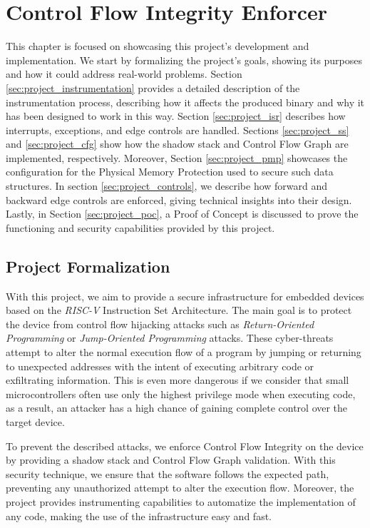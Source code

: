 \chapter{Control Flow Integrity Enforcer}
\label{cha:project}

This chapter is focused on showcasing this project's development and
implementation. We start by formalizing the project's goals, showing its
purposes and how it could address real-world problems. Section \ref{sec:project_instrumentation}
provides a detailed description of the instrumentation process, describing how
it affects the produced binary and why it has been designed to work in this way.
Section \ref{sec:project_isr} describes how interrupts, exceptions, and edge controls
are handled. Sections \ref{sec:project_ss} and \ref{sec:project_cfg} show how
the shadow stack and Control Flow Graph are implemented, respectively. Moreover,
Section \ref{sec:project_pmp} showcases the configuration for the Physical Memory
Protection used to secure such data structures. In section
\ref{sec:project_controls}, we describe how forward and backward edge controls are
enforced, giving technical insights into their design. Lastly, in Section
\ref{sec:project_poc}, a Proof of Concept is discussed to prove the functioning and
security capabilities provided by this project.

\section{Project Formalization}
\label{sec:project_formalization}

With this project, we aim to provide a secure infrastructure for embedded devices
based on the \textit{RISC-V} Instruction Set Architecture. The main goal is to protect
the device from control flow hijacking attacks such as \textit{Return-Oriented
Programming} or \textit{Jump-Oriented Programming} attacks. These cyber-threats
attempt to alter the normal execution flow of a program by jumping or returning
to unexpected addresses with the intent of executing arbitrary code or
exfiltrating information. This is even more dangerous if we consider that small microcontrollers
often use only the highest privilege mode when executing code, as a result, an attacker
has a high chance of gaining complete control over the target device.

To prevent the described attacks, we enforce Control Flow Integrity on the
device by providing a shadow stack and Control Flow Graph validation. With this security
technique, we ensure that the software follows the expected path, preventing any
unauthorized attempt to alter the execution flow. Moreover, the project provides
instrumenting capabilities to automatize the implementation of any code, making
the use of the infrastructure easy and fast.

